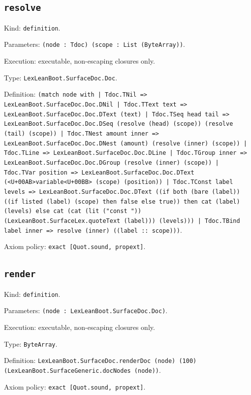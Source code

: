 \documentclass[11pt]{article}
\begin{document}
\subsection*{\texttt{resolve}}
\noindent Kind: \texttt{definition}.\par
\noindent Parameters: \texttt{(node : Tdoc) (scope : List (ByteArray))}.\par
\noindent Execution: executable, non-escaping closures only.\par
\noindent Type: \texttt{LexLeanBoot.SurfaceDoc.Doc}.\par
\noindent Definition: \texttt{(match node with | Tdoc.TNil => LexLeanBoot.SurfaceDoc.Doc.DNil | Tdoc.TText text => LexLeanBoot.SurfaceDoc.Doc.DText (text) | Tdoc.TSeq head tail => LexLeanBoot.SurfaceDoc.Doc.DSeq (resolve (head) (scope)) (resolve (tail) (scope)) | Tdoc.TNest amount inner => LexLeanBoot.SurfaceDoc.Doc.DNest (amount) (resolve (inner) (scope)) | Tdoc.TLine => LexLeanBoot.SurfaceDoc.Doc.DLine | Tdoc.TGroup inner => LexLeanBoot.SurfaceDoc.Doc.DGroup (resolve (inner) (scope)) | Tdoc.TVar position => LexLeanBoot.SurfaceDoc.Doc.DText (<U+00AB>variable<U+00BB> (scope) (position)) | Tdoc.TConst label levels => LexLeanBoot.SurfaceDoc.Doc.DText ((if both (bare (label)) ((if listed (label) (scope) then false else true)) then cat (label) (levels) else cat (cat (lit ("const ")) (LexLeanBoot.SurfaceLex.quoteText (label))) (levels))) | Tdoc.TBind label inner => resolve (inner) ((label :: scope)))}.\par
\noindent Axiom policy: \texttt{exact [Quot.sound, propext]}.\par
\subsection*{\texttt{render}}
\noindent Kind: \texttt{definition}.\par
\noindent Parameters: \texttt{(node : LexLeanBoot.SurfaceDoc.Doc)}.\par
\noindent Execution: executable, non-escaping closures only.\par
\noindent Type: \texttt{ByteArray}.\par
\noindent Definition: \texttt{LexLeanBoot.SurfaceDoc.renderDoc (node) (100) (LexLeanBoot.SurfaceGeneric.docNodes (node))}.\par
\noindent Axiom policy: \texttt{exact [Quot.sound, propext]}.\par
\end{document}
